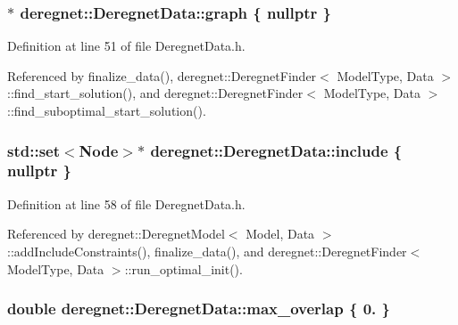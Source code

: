 \subsubsection[{\texorpdfstring{graph}{graph}}]{$\ast$ deregnet\+::\+Deregnet\+Data\+::graph \{ nullptr \}}\hypertarget{classderegnet_1_1DeregnetData_ab76d30fa2ef87099faecb31e3f95b6d6}{}\label{classderegnet_1_1DeregnetData_ab76d30fa2ef87099faecb31e3f95b6d6}


Definition at line 51 of file Deregnet\+Data.\+h.



Referenced by finalize\+\_\+data(), deregnet\+::\+Deregnet\+Finder$<$ Model\+Type, Data $>$\+::find\+\_\+start\+\_\+solution(), and deregnet\+::\+Deregnet\+Finder$<$ Model\+Type, Data $>$\+::find\+\_\+suboptimal\+\_\+start\+\_\+solution().

\subsubsection[{\texorpdfstring{include}{include}}]{\setlength{\rightskip}{0pt plus 5cm}std\+::set$<${\bf Node}$>$$\ast$ deregnet\+::\+Deregnet\+Data\+::include \{ nullptr \}}\hypertarget{classderegnet_1_1DeregnetData_a438d16e60be5d119d174aa039f070ab2}{}\label{classderegnet_1_1DeregnetData_a438d16e60be5d119d174aa039f070ab2}


Definition at line 58 of file Deregnet\+Data.\+h.



Referenced by deregnet\+::\+Deregnet\+Model$<$ Model, Data $>$\+::add\+Include\+Constraints(), finalize\+\_\+data(), and deregnet\+::\+Deregnet\+Finder$<$ Model\+Type, Data $>$\+::run\+\_\+optimal\+\_\+init().

\subsubsection[{\texorpdfstring{max\+\_\+overlap}{max_overlap}}]{\setlength{\rightskip}{0pt plus 5cm}double deregnet\+::\+Deregnet\+Data\+::max\+\_\+overlap \{ 0. \}}\hypertarget{classderegnet_1_1DeregnetData_a43111d8664fd9db36f36f75b24ba62e9}{}\label{classderegnet_1_1DeregnetData_a43111d8664fd9db36f36f75b24ba62e9}


